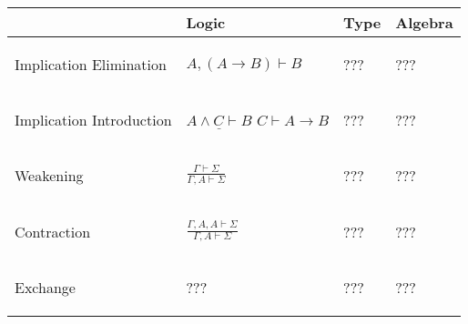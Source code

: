 \begin{tabular}{| p{2cm} | p{3cm} | p{4.5cm} | p{3cm} |}
\hline
& \textbf{Logic} & \textbf{Type} & \textbf{Algebra}\\ \hline \hline
Implication Elimination
  & \begin{center} $A, (A \rightarrow B) \vdash B$ \end{center}
  & \begin{center} ??? \end{center}
  & \begin{center} ??? \end{center} \\ \hline
Implication Introduction
  & \begin{center}
      $\underline{A \wedge C \vdash B}$\newline
      $C \vdash A \rightarrow B$
    \end{center}
  & \begin{center} ??? \end{center}
  & \begin{center} ??? \end{center} \\ \hline
Weakening
  & \begin{center} $\frac{\Gamma \vdash \Sigma}
    {\Gamma,A \vdash \Sigma}$ \end{center}
  & \begin{center} ??? \end{center}
  & \begin{center} ??? \end{center} \\ \hline
Contraction
  & \begin{center} $\frac{\Gamma,A,A \vdash \Sigma}
    {\Gamma,A \vdash \Sigma}$ \end{center}
  & \begin{center} ??? \end{center}
  & \begin{center} ??? \end{center} \\ \hline
Exchange
  & \begin{center} ??? \end{center}
  & \begin{center} ??? \end{center}
  & \begin{center} ??? \end{center} \\ \hline
\hline
\end{tabular}

